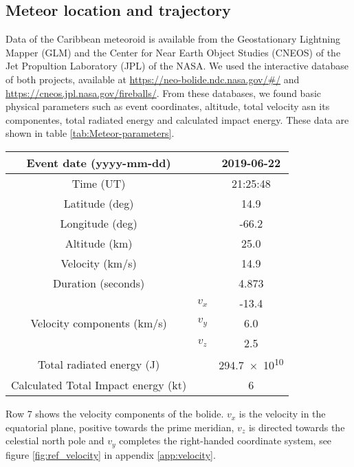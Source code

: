 \subsection{Meteor location and trajectory}
\label{ssec:databases}

Data of the Caribbean meteoroid is available from the Geostationary Lightning Mapper (GLM) \citep{GOODMAN:2013} and the Center for Near Earth Object Studies (CNEOS) of the Jet Propultion Laboratory (JPL) of the NASA. We used the interactive database of both projects, available at \url{https://neo-bolide.ndc.nasa.gov/#/} and \url{https://cneos.jpl.nasa.gov/fireballs/}. From these databases, we found basic physical parameters such as event coordinates, altitude, total velocity asn its componentes, total radiated energy and calculated impact energy. These data are shown in table \ref{tab:Meteor-parameters}. 

\begin{table*}[t]
    \centering
    \caption{List of meteor basic parameters. Source: \url{https://cneos.jpl.nasa.gov/fireballs/}}
    \begin{tabular}{cc|c}
     \toprule
    Event date  (yyyy-mm-dd)&   & 2019-06-22 \\\hline
    Time (UT) & &21:25:48\\\hline
    Latitude (deg) & & 14.9\\\hline
    Longitude (deg) & & -66.2\\\hline
    Altitude (km) & &25.0\\\hline
    Velocity (km/s) & & 14.9\\\hline
    Duration (seconds)& & 4.873 \\\hline
    \multirow{3}{*}{Velocity components (km/s)}&$v_x$ & -13.4 \\\cline{2-3}
     & $v_y$& 6.0\\\cline{2-3}
     & $v_z$ & 2.5\\\hline
    Total radiated energy (J) & &\SI{294.7e10}{}\\\hline
    Calculated Total Impact energy (kt)&  & 6 \\
    \bottomrule
    \end{tabular}
    \label{tab:Meteor-parameters}
\end{table*}

Row 7 shows the velocity components of the bolide. $v_x$ is the velocity in the equatorial plane, positive towards the prime meridian, $v_z$ is directed towards the celestial north pole and $v_y$ completes the right-handed coordinate system, see figure \ref{fig:ref_velocity} in appendix \ref{app:velocity}. 


